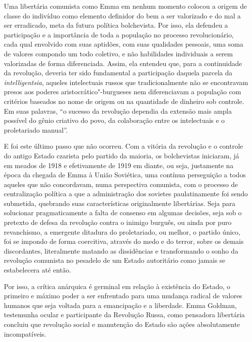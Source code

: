 Uma libertária comunista como Emma em nenhum momento colocou a origem de
classe do indivíduo como elemento definidor do bem a ser valorizado e
do mal a ser erradicado, meta da futura política bolchevista. Por isso,
ela defendeu a participação e a importância de toda a população no
processo revolucionário, cada qual envolvido com suas aptidões, com
suas qualidades pessoais, uma soma de valores compondo um todo coletivo,
e não habilidades individuais a serem valorizadas de forma
diferenciada. Assim, ela entendeu que, para a continuidade da
revolução, deveria ter sido fundamental a participação daquela parcela
da \textit{intelligentsia}, aqueles intelectuais russos que tradicionalmente não
se encontravam presos aos poderes aristocrático"-burgueses nem
diferenciavam a população com critérios baseados no nome de origem ou
na quantidade de dinheiro sob controle. Em suas palavras, “o sucesso da
revolução dependia da extensão mais ampla possível do gênio criativo do
povo, da colaboração entre os intelectuais e o proletariado manual”.

E foi este último passo que não ocorreu. Com a vitória da revolução e o
controle do antigo Estado czarista pelo partido da maioria, os
bolchevistas iniciaram, já em meados de 1918 e efetivamente de
1919 em diante, ou seja, justamente na época da chegada de Emma à União
Soviética, uma contínua perseguição a todos aqueles
que não concordavam, numa perspectiva comunista, com o processo de
centralização política a que a administração dos sovietes
paulatinamente foi sendo submetida, quebrando suas características
originalmente libertárias. Seja para solucionar pragmaticamente a falta
de consenso em algumas decisões, seja sob o pretexto de defesa da
revolução contra o inimigo burguês, ou ainda por puro revanchismo, a
emergente ditadura do proletariado, ou melhor, o partido único, foi se
impondo de forma coercitiva, através do medo e do terror, sobre os
demais discordantes, literalmente matando as dissidências e
transformando o sonho da revolução comunista no pesadelo de um Estado
autoritário como jamais se estabelecera até então. 

Por isso, a crítica anárquica é germinal em relação à existência do
Estado, o primeiro e máximo poder a ser enfrentado para uma mudança
radical de valores humanos que seja voltada para a emancipação e a
liberdade. Emma Goldman, testemunha ocular e participante da Revolução
Russa, como pensadora libertária concluiu que revolução social e
manutenção do Estado são ações absolutamente incompatíveis.


